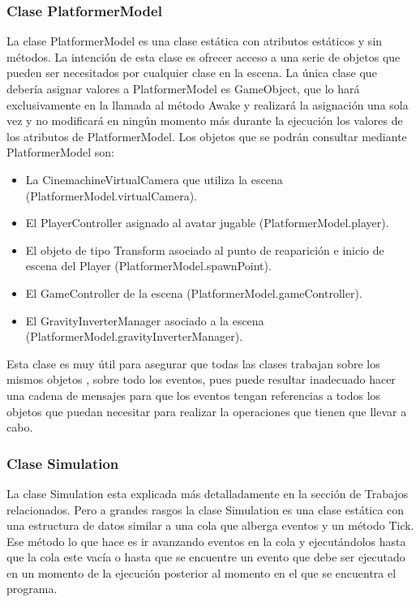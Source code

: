 \subsubsection{Clase PlatformerModel}
La clase PlatformerModel es una clase estática con atributos estáticos y sin métodos. La intención de esta clase es ofrecer acceso a una serie de objetos que pueden ser necesitados por cualquier clase en la escena. La única clase que debería asignar valores a PlatformerModel es GameObject, que lo hará exclusivamente en la llamada al método Awake y realizará la asignación una sola vez y no modificará en ningún momento más durante la ejecución los valores de los atributos de PlatformerModel. Los objetos que se podrán consultar mediante PlatformerModel son:
\begin{itemize}
\item
La CinemachineVirtualCamera que utiliza la escena (PlatformerModel.virtualCamera).
\item
El PlayerController asignado al avatar jugable (PlatformerModel.player).
\item
El objeto de tipo Transform asociado al punto de reaparición e inicio de escena del Player (PlatformerModel.spawnPoint).
\item
El GameController de la escena (PlatformerModel.gameController).
\item
El GravityInverterManager asociado a la escena \\ (PlatformerModel.gravityInverterManager).
\end{itemize}
Esta clase es muy útil para asegurar que todas las clases trabajan sobre los mismos objetos , sobre todo los eventos, pues puede resultar inadecuado hacer una cadena de mensajes para que los eventos tengan referencias a todos los objetos que puedan necesitar para realizar la operaciones que tienen que llevar a cabo.

\subsubsection{Clase Simulation}
La clase Simulation esta explicada más detalladamente en la sección de Trabajos relacionados. Pero a grandes rasgos la clase Simulation es una clase estática con una estructura de datos similar a una cola que alberga eventos y un método Tick. Ese método lo que hace es ir avanzando eventos en la cola y ejecutándolos hasta que la cola este vacía o hasta que se encuentre un evento que debe ser ejecutado en un momento de la ejecución posterior al momento en el que se encuentra el programa.

